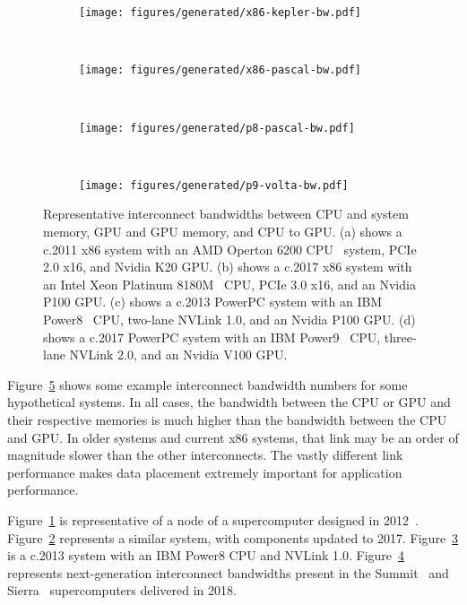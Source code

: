 \begin{figure}[ht]
    \centering
    \begin{subfigure}[b]{0.2\textwidth}
        \texttt{[image: figures/generated/x86-kepler-bw.pdf]}
        \caption{}
        \label{fig:x86-kepler-bw}
    \end{subfigure}
	~
	\begin{subfigure}[b]{0.2\textwidth}
        \texttt{[image: figures/generated/x86-pascal-bw.pdf]}
        \caption{}
        \label{fig:x86-pascal-bw}
    \end{subfigure}
    ~
    \begin{subfigure}[b]{0.2\textwidth}
        \texttt{[image: figures/generated/p8-pascal-bw.pdf]}
        \caption{}
        \label{fig:p8-pascal-bw}
    \end{subfigure}
    ~
    \begin{subfigure}[b]{0.2\textwidth}
        \texttt{[image: figures/generated/p9-volta-bw.pdf]}
        \caption{}
        \label{fig:p9-volta-bw}
    \end{subfigure}
	\caption[Example System Interconnect Bandwidths]{
		Representative interconnect bandwidths between CPU and system memory, GPU and GPU memory, and CPU to GPU.
		(a) shows a c.2011 x86 system with an AMD Operton 6200 CPU~\cite{amd2012opteron6200} system, PCIe 2.0 x16, and Nvidia K20 GPU.
		(b) shows a c.2017 x86 system with an Intel Xeon Platinum 8180M~\cite{intel20188180m} CPU, PCIe 3.0 x16, and an Nvidia P100 GPU.
		(c) shows a c.2013 PowerPC system with an IBM Power8~\cite{stuechli2013power8} CPU, two-lane NVLink 1.0, and an Nvidia P100 GPU.
		(d) shows a c.2017 PowerPC system with an IBM Power9~\cite{thompto2016power9} CPU, three-lane NVLink 2.0, and an Nvidia V100 GPU.
	}
    \label{fig:gpu-sys-arch}
\end{figure}

Figure~\ref{fig:gpu-sys-arch} shows some example interconnect bandwidth numbers for some hypothetical systems.
In all cases, the bandwidth between the CPU or GPU and their respective memories is much higher than the bandwidth between the CPU and GPU.
In older systems and current x86 systems, that link may be an order of magnitude slower than the other interconnects.
The vastly different link performance makes data placement extremely important for application performance.

Figure~\ref{fig:x86-kepler-bw} is representative of a node of a supercomputer designed in 2012~\cite{ncsa2018bluewaters}.
Figure~\ref{fig:x86-pascal-bw} represents a similar system, with components updated to 2017.
Figure~\ref{fig:p8-pascal-bw} is a c.2013 system with an IBM Power8 CPU and NVLink 1.0.
Figure~\ref{fig:p9-volta-bw} represents next-generation interconnect bandwidths present in the Summit~\cite{ornl2018summit} and Sierra~\cite{llnl2018sierra} supercomputers delivered in 2018.

